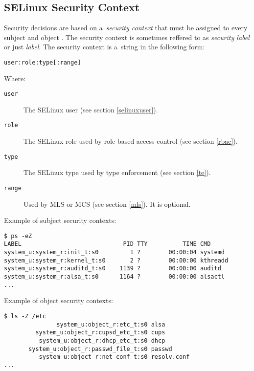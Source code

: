 \subsection{SELinux Security Context}
\label{context}
Security decisions are based on a~\emph{security context} that must be assigned
to every subject and object \cite[pp.~27--28]{tsn}. The security context is
sometimes reffered to as \emph{security label} or just \emph{label}.  The
security context is a~string in the following form:
\begin{lstlisting}
user:role:type[:range]
\end{lstlisting}
Where:
\begin{description}
    \item [\texttt{user}] The SELinux user (see section \ref{selinuxuser}).
    \item [\texttt{role}] The SELinux role used by role-based access control
        (see section \ref{rbac}).
    \item [\texttt{type}] The SELinux type used by type enforcement (see section
        \ref{te}).
    \item [\texttt{range}] Used by MLS or MCS (see section \ref{mls}). It is optional.
\end{description}

Example of subject security contexts:
\begin{lstlisting}
$ ps -eZ
LABEL                             PID TTY          TIME CMD
system_u:system_r:init_t:s0         1 ?        00:00:04 systemd
system_u:system_r:kernel_t:s0       2 ?        00:00:00 kthreadd
system_u:system_r:auditd_t:s0    1139 ?        00:00:00 auditd
system_u:system_r:alsa_t:s0      1164 ?        00:00:00 alsactl
...
\end{lstlisting}

Example of object security contexts:
\begin{lstlisting}
$ ls -Z /etc
               system_u:object_r:etc_t:s0 alsa
         system_u:object_r:cupsd_etc_t:s0 cups
          system_u:object_r:dhcp_etc_t:s0 dhcp
       system_u:object_r:passwd_file_t:s0 passwd
          system_u:object_r:net_conf_t:s0 resolv.conf
...
\end{lstlisting}

